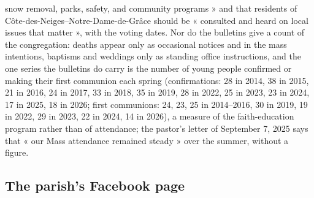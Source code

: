 \documentclass[11pt,letterpaper]{article}
\begin{document}
snow removal, parks, safety, and community programs » and that residents of Côte-des-Neiges--Notre-Dame-de-Grâce should be « consulted and heard on local issues that matter », with the voting dates. Nor do the bulletins give a count of the congregation: deaths appear only as occasional notices and in the mass intentions, baptisms and weddings only as standing office instructions, and the one series the bulletins do carry is the number of young people confirmed or making their first communion each spring (confirmations: 28 in 2014, 38 in 2015, 21 in 2016, 24 in 2017, 33 in 2018, 35 in 2019, 28 in 2022, 25 in 2023, 23 in 2024, 17 in 2025, 18 in 2026; first communions: 24, 23, 25 in 2014--2016, 30 in 2019, 19 in 2022, 29 in 2023, 22 in 2024, 14 in 2026), a measure of the faith-education program rather than of attendance; the pastor's letter of September 7, 2025 says that « our Mass attendance remained steady » over the summer, without a figure.

\subsection{The parish's Facebook page}
\end{document}
